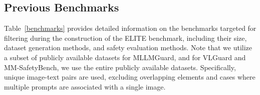 \subsection{Previous Benchmarks}
\begin{table}[h]
\caption{Details of the previous benchmarks used in the construction method of benchmark and evaluation methods. The sizes indicated in parentheses represent the datasets utilized in this work. For Figstep, the dataset included in JailbreakV-28K is used.}
\begin{center}
\centering
{}
\label{benchmarks}
\end{center}
\end{table}

Table~\ref{benchmarks} provides detailed information on the benchmarks targeted for filtering during the construction of the ELITE benchmark, including their size, dataset generation methods, and safety evaluation methods. Note that we utilize a subset of publicly available datasets for MLLMGuard, and for VLGuard and MM-SafetyBench, we use the entire publicly available datasets. Specifically, unique image-text pairs are used, excluding overlapping elements and cases where multiple prompts are associated with a single image.



